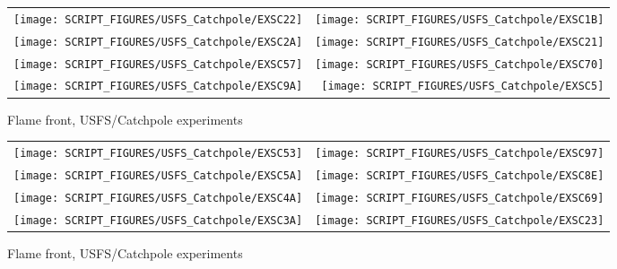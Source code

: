 \begin{figure}[p]
\begin{tabular*}{\textwidth}{l@{\extracolsep{\fill}}r}
\texttt{[image: SCRIPT\_FIGURES/USFS\_Catchpole/EXSC22]} &
\texttt{[image: SCRIPT\_FIGURES/USFS\_Catchpole/EXSC1B]} \\
\texttt{[image: SCRIPT\_FIGURES/USFS\_Catchpole/EXSC2A]} &
\texttt{[image: SCRIPT\_FIGURES/USFS\_Catchpole/EXSC21]} \\
\texttt{[image: SCRIPT\_FIGURES/USFS\_Catchpole/EXSC57]} &
\texttt{[image: SCRIPT\_FIGURES/USFS\_Catchpole/EXSC70]} \\
\texttt{[image: SCRIPT\_FIGURES/USFS\_Catchpole/EXSC9A]} &
\texttt{[image: SCRIPT\_FIGURES/USFS\_Catchpole/EXSC5]} \\
\end{tabular*}
\caption[Flame front, USFS/Catchpole experiments]{Flame front, USFS/Catchpole experiments}
\label{USFS_Catchpole_104}
\end{figure}

\begin{figure}[p]
\begin{tabular*}{\textwidth}{l@{\extracolsep{\fill}}r}
\texttt{[image: SCRIPT\_FIGURES/USFS\_Catchpole/EXSC53]} &
\texttt{[image: SCRIPT\_FIGURES/USFS\_Catchpole/EXSC97]} \\
\texttt{[image: SCRIPT\_FIGURES/USFS\_Catchpole/EXSC5A]} &
\texttt{[image: SCRIPT\_FIGURES/USFS\_Catchpole/EXSC8E]} \\
\texttt{[image: SCRIPT\_FIGURES/USFS\_Catchpole/EXSC4A]} &
\texttt{[image: SCRIPT\_FIGURES/USFS\_Catchpole/EXSC69]} \\
\texttt{[image: SCRIPT\_FIGURES/USFS\_Catchpole/EXSC3A]} &
\texttt{[image: SCRIPT\_FIGURES/USFS\_Catchpole/EXSC23]} \\
\end{tabular*}
\caption[Flame front, USFS/Catchpole experiments]{Flame front, USFS/Catchpole experiments}
\label{USFS_Catchpole_112}
\end{figure}

